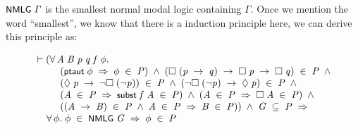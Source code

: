 \documentclass[letterpaper]{article}
\renewcommand{\HOLConst}[1]{{\textsf{\upshape\small #1}}}
\renewcommand{\HOLinline}[1]{\ensuremath{#1}}
\newenvironment{holmath}{\begin{displaymath}\begin{array}{l}}{\end{array}\end{displaymath}\ignorespacesafterend}
\begin{document}
\HOLinline{\HOLConst{NMLG}\;\HOLFreeVar{\ensuremath{\Gamma}}} is the smallest normal modal logic containing $\Gamma$. Once we mention the word ``smallest'', we know that there is a induction principle here, we can derive this principle as:

\begin{holmath}
  \ensuremath{\HOLTokenTurnstile}(\HOLSymConst{\HOLTokenForall{}}\HOLBoundVar{A}\;\HOLBoundVar{B}\;\HOLBoundVar{p}\;\HOLBoundVar{q}\;\HOLBoundVar{f}\;\HOLBoundVar{\ensuremath{\phi}}.\\
\;\;\;\;\;\;\;\;\;\;(\HOLConst{ptaut}\;\HOLBoundVar{\ensuremath{\phi}}\;\HOLSymConst{\HOLTokenImp{}}\;\HOLBoundVar{\ensuremath{\phi}}\;\HOLSymConst{\HOLTokenIn{}}\;\HOLFreeVar{P})\;\HOLSymConst{\HOLTokenConj{}}\;(\HOLSymConst{\ensuremath{\Box}}\;(\HOLBoundVar{p}\;\HOLSymConst{\ensuremath{\rightarrow}}\;\HOLBoundVar{q})\;\HOLSymConst{\ensuremath{\rightarrow}}\;\HOLSymConst{\ensuremath{\Box}}\;\HOLBoundVar{p}\;\HOLSymConst{\ensuremath{\rightarrow}}\;\HOLSymConst{\ensuremath{\Box}}\;\HOLBoundVar{q})\;\HOLSymConst{\HOLTokenIn{}}\;\HOLFreeVar{P}\;\HOLSymConst{\HOLTokenConj{}}\\
\;\;\;\;\;\;\;\;\;\;(\HOLSymConst{\ensuremath{\Diamond}}\;\HOLBoundVar{p}\;\HOLSymConst{\ensuremath{\rightarrow}}\;\HOLSymConst{\HOLTokenNeg{}}\HOLSymConst{\ensuremath{\Box}}\;(\HOLSymConst{\HOLTokenNeg{}}\HOLBoundVar{p}))\;\HOLSymConst{\HOLTokenIn{}}\;\HOLFreeVar{P}\;\HOLSymConst{\HOLTokenConj{}}\;(\HOLSymConst{\HOLTokenNeg{}}\HOLSymConst{\ensuremath{\Box}}\;(\HOLSymConst{\HOLTokenNeg{}}\HOLBoundVar{p})\;\HOLSymConst{\ensuremath{\rightarrow}}\;\HOLSymConst{\ensuremath{\Diamond}}\;\HOLBoundVar{p})\;\HOLSymConst{\HOLTokenIn{}}\;\HOLFreeVar{P}\;\HOLSymConst{\HOLTokenConj{}}\\
\;\;\;\;\;\;\;\;\;\;(\HOLBoundVar{A}\;\HOLSymConst{\HOLTokenIn{}}\;\HOLFreeVar{P}\;\HOLSymConst{\HOLTokenImp{}}\;\HOLConst{subst}\;\HOLBoundVar{f}\;\HOLBoundVar{A}\;\HOLSymConst{\HOLTokenIn{}}\;\HOLFreeVar{P})\;\HOLSymConst{\HOLTokenConj{}}\;(\HOLBoundVar{A}\;\HOLSymConst{\HOLTokenIn{}}\;\HOLFreeVar{P}\;\HOLSymConst{\HOLTokenImp{}}\;\HOLSymConst{\ensuremath{\Box}}\;\HOLBoundVar{A}\;\HOLSymConst{\HOLTokenIn{}}\;\HOLFreeVar{P})\;\HOLSymConst{\HOLTokenConj{}}\\
\;\;\;\;\;\;\;\;\;\;((\HOLBoundVar{A}\;\HOLSymConst{\ensuremath{\rightarrow}}\;\HOLBoundVar{B})\;\HOLSymConst{\HOLTokenIn{}}\;\HOLFreeVar{P}\;\HOLSymConst{\HOLTokenConj{}}\;\HOLBoundVar{A}\;\HOLSymConst{\HOLTokenIn{}}\;\HOLFreeVar{P}\;\HOLSymConst{\HOLTokenImp{}}\;\HOLBoundVar{B}\;\HOLSymConst{\HOLTokenIn{}}\;\HOLFreeVar{P}))\;\HOLSymConst{\HOLTokenConj{}}\;\HOLFreeVar{G}\;\HOLSymConst{\HOLTokenSubset{}}\;\HOLFreeVar{P}\;\HOLSymConst{\HOLTokenImp{}}\\
\;\;\;\;\;\HOLSymConst{\HOLTokenForall{}}\HOLBoundVar{\ensuremath{\phi}}.\;\HOLBoundVar{\ensuremath{\phi}}\;\HOLSymConst{\HOLTokenIn{}}\;\HOLConst{NMLG}\;\HOLFreeVar{G}\;\HOLSymConst{\HOLTokenImp{}}\;\HOLBoundVar{\ensuremath{\phi}}\;\HOLSymConst{\HOLTokenIn{}}\;\HOLFreeVar{P}
\end{holmath}
\end{document}
